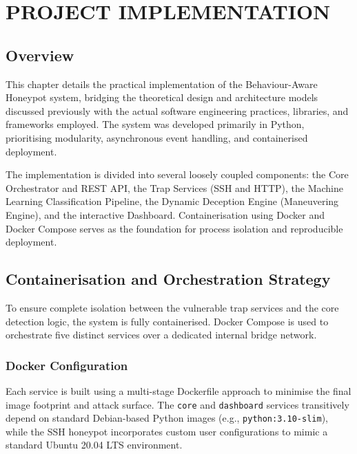 \chapter{\MakeUppercase{Project Implementation}}

\paragraph{}

\section{Overview}

This chapter details the practical implementation of the Behaviour-Aware Honeypot system, bridging the theoretical design and architecture models discussed previously with the actual software engineering practices, libraries, and frameworks employed. The system was developed primarily in Python, prioritising modularity, asynchronous event handling, and containerised deployment.

The implementation is divided into several loosely coupled components: the Core Orchestrator and REST API, the Trap Services (SSH and HTTP), the Machine Learning Classification Pipeline, the Dynamic Deception Engine (Maneuvering Engine), and the interactive Dashboard. Containerisation using Docker and Docker Compose serves as the foundation for process isolation and reproducible deployment.

\section{Containerisation and Orchestration Strategy}

To ensure complete isolation between the vulnerable trap services and the core detection logic, the system is fully containerised. Docker Compose is used to orchestrate five distinct services over a dedicated internal bridge network.

\subsection{Docker Configuration}
Each service is built using a multi-stage Dockerfile approach to minimise the final image footprint and attack surface. The \texttt{core} and \texttt{dashboard} services transitively depend on standard Debian-based Python images (e.g., \texttt{python:3.10-slim}), while the \ac{SSH} honeypot incorporates custom user configurations to mimic a standard Ubuntu 20.04 LTS environment. 

